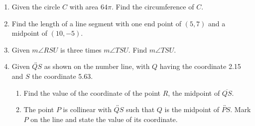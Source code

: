 \begin{enumerate}
\item Given the circle $C$ with area $64\pi$. Find the circumference of $C$. \vspace{4cm}

\item Find the length of a line segment with one end point of $(5,7)$ and a midpoint of $(10, -5)$. \vspace{5cm}

\newpage
\item Given $m\angle RSU$ is three times $m\angle TSU$. Find $m\angle TSU$.\\[1cm]
\vspace{3cm}

\item Given $\overleftrightarrow{QS}$ as shown on the number line, with $Q$ having the coordinate 2.15 and $S$ the coordinate 5.63. \\[20pt] %
   \bigskip
  \begin{enumerate}
    \item Find the value of the coordinate of the point $R$, the midpoint of $\overline{QS}$. \vspace{4cm}
    \item The point $P$ is collinear with $\overleftrightarrow{QS}$ such that $Q$ is the midpoint of $\overleftrightarrow{PS}$. Mark $P$ on the line and state the value of its coordinate.
  \end{enumerate}\vspace{4cm}



\end{enumerate}

